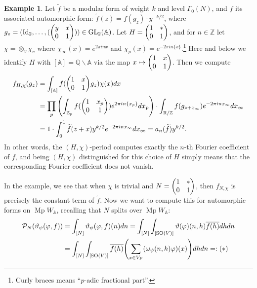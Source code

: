 \documentclass[11pt,a4paper,leqno]{article}
\let\mc\mathcal
\newcommand{\A}{\mathbb{A}}
\newcommand{\1}{\mathbbm{1}}
\newcommand{\Z}{\mathbb{Z}}
\newcommand{\Q}{\mathbb{Q}}
\newcommand{\R}{\mathbb{R}}
\renewcommand{\tilde}{\widetilde}
\renewcommand{\phi}{\varphi}
\renewcommand{\theta}{\vartheta}
\DeclareMathOperator{\Mp}{Mp}
\DeclareMathOperator{\SO}{SO}
\DeclareMathOperator{\GL}{GL}
\DeclareMathOperator{\Id}{Id}
\theoremstyle{plain}
\theoremstyle{definition}
\newtheorem{example}[theorem]{Example}
\theoremstyle{remark}
\numberwithin{equation}{section}
\begin{document}
\begin{example}
  Let $\tilde f$ be a modular form of weight $k$ and level
  $\Gamma_{0}(N)$, and $f$ its associated automorphic form:
  $\tilde f(z) = f(g_{z}) \cdot y^{-k/2}$, where
  $g_{z} = (\Id_{2},\ldots, (\mqty(y & x \\ 0 & 1))) \in \GL_{2}(\A)$. Let
  $H = \mqty(1 & * \\ 0 & 1)$, and for $n \in \Z$ let
  $\chi = \otimes_{v}\chi_{v}$ where
  $\chi_{\infty}(x) = e^{2\pi i nx}$ and
  $\chi_{p}(x) = e^{-2\pi in \{x\}}$.\footnote{Curly braces means
    ``$p$-adic fractional part''.} Here and below we identify $H$ with
  $[\A] = \Q \backslash \A$ via the map
  $x \mapsto \mqty(1 & x \\ 0 & 1)$. Then we compute
\begin{subequations}
  \begin{align}
    \label{eq:35}
    f_{H,\chi}(g_{z})
    &= \int_{[\A]}f(\mqty(1  & x \\ 0 & 1)g_{z})\chi(x)dx \\
    &= \prod_{p}\qty(\int_{\Z_{p}}f(\mqty(1  & x_{p} \\ 0 & 1))e^{2\pi in
                                                     \{x_{p}\}}dx_{p})\cdot
                                                     \int_{\R/\Z}
                                                     f(g_{z+x_{\infty}})e^{-2\pi
                                                     in x_{\infty}}dx_{\infty}\\
    &= 1\cdot \int_0^{1} \tilde f(z+x)y^{k/2}e^{-2\pi i nx_{\infty}}dx_{\infty} =
      a_{n}(\tilde f)y^{k/2}.
  \end{align}
\end{subequations}
In other words, the $(H,\chi)$-period computes exactly the $n$-th Fourier
coefficient of $f$, and being $(H,\chi)$ distinguished for this choice of
$H$ simply means that the corresponding Fourier coefficient does not
vanish.
\end{example}
In the example, we see that when $\chi$ is trivial and
$N = \mqty(1 & * \\ 0 & 1)$, then $f_{N,\chi}$ is precisely the constant
term of $\tilde f$. Now we want to compute this for automorphic forms
on $\Mp W_{\A}$, recalling that $N$ splits over $\Mp W_{\A}$:
\begin{subequations}
  \begin{align}
    \label{eq:36}
    \mc P_{N}(\theta_{\psi}(\phi,f))
    & = \int_{[N]}\theta_{\psi}(\phi,f)(n)dn = \int_{[N]}\int_{[\SO(V)]}
      \theta(\phi)(n,h)\overline{f(h)}dhdn \\
    & = \int_{[N]}\int_{[\SO(V)]}\overline{f(h)} \qty(\sum_{x \in V_{F}}
      (\omega_{\psi}(n,h)\phi)(x))dhdn =: (*)
  \end{align}
\end{subequations}
\end{document}
